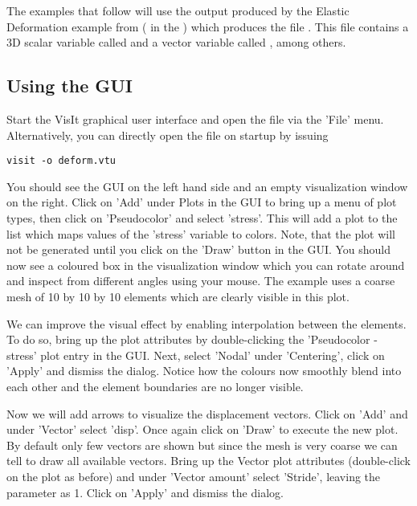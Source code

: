 The examples that follow will use the output produced by the Elastic
Deformation example from  ( in the
\ExampleDirectory) which produces the file .
This \VTK file contains a 3D scalar variable called  and a vector
variable called , among others.

\subsection{Using the \VisIt GUI}
Start the VisIt graphical user interface and open the file 
via the 'File' menu. Alternatively, you can directly open the file on startup
by issuing
\begin{verbatim}
visit -o deform.vtu
\end{verbatim}
You should see the \VisIt GUI on the left hand side and an empty visualization
window on the right. Click on 'Add' under Plots in the GUI to bring up a menu
of plot types, then click on 'Pseudocolor' and select 'stress'.
This will add a plot to the list which maps values of the 'stress' variable to
colors. Note, that the plot will not be generated until you click on the 'Draw'
button in the GUI. You should now see a coloured box in the visualization
window which you can rotate around and inspect from different angles using your
mouse. The example uses a coarse mesh of 10 by 10 by 10 elements which are
clearly visible in this plot.

We can improve the visual effect by enabling interpolation between the elements.
To do so, bring up the plot attributes by double-clicking the
'Pseudocolor - stress' plot entry in the GUI.
Next, select 'Nodal' under 'Centering', click on 'Apply' and dismiss the dialog.
Notice how the colours now smoothly blend into each other and the element
boundaries are no longer visible.

Now we will add arrows to visualize the displacement vectors. Click on 'Add'
and under 'Vector' select 'disp'. Once again click on 'Draw' to execute the
new plot. By default only few vectors are shown but since the mesh is very
coarse we can tell \VisIt to draw all available vectors.
Bring up the Vector plot attributes (double-click on the plot as before) and
under 'Vector amount' select 'Stride', leaving the parameter as 1.
Click on 'Apply' and dismiss the dialog.

